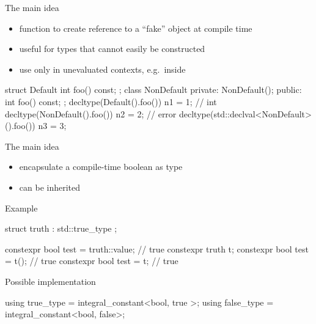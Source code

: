 \begin{frame}[fragile]
  \begin{block}{The main idea}
    \begin{itemize}
    \item function to create reference to a ``fake'' object at compile time
    \item useful for types that cannot easily be constructed
    \item use only in unevaluated contexts, e.g.\ inside 
    \end{itemize}
  \end{block}
  \begin{exampleblock}{}
    \begin{cppcode*}{}
      struct Default {
        int foo() const;
      };
      class NonDefault {
        private: NonDefault();
        public:  int foo() const;
      };
      decltype(Default().foo()) n1 = 1;     // int
      decltype(NonDefault().foo()) n2 = 2; // error
      decltype(std::declval<NonDefault>().foo()) n3 = 3;
    \end{cppcode*}
  \end{exampleblock}
\end{frame}

\begin{frame}[fragile]
  \begin{block}{The main idea}
    \begin{itemize}
    \item encapsulate a compile-time boolean as type
    \item can be inherited
    \end{itemize}
  \end{block}
  \begin{exampleblock}{Example}
    \begin{cppcode*}{}
      struct truth : std::true_type { };

      constexpr bool test = truth::value; // true
      constexpr truth t;
      constexpr bool test = t(); // true
      constexpr bool test = t;   // true
    \end{cppcode*}
  \end{exampleblock}
  \begin{exampleblock}{Possible implementation}
    \begin{cppcode*}{}
      using true_type  = integral_constant<bool, true >;
      using false_type = integral_constant<bool, false>;
    \end{cppcode*}
  \end{exampleblock}
\end{frame}

